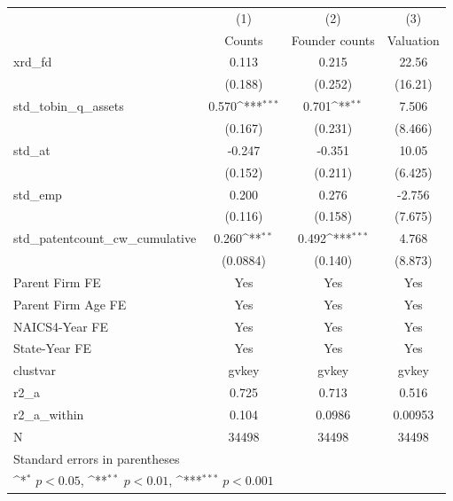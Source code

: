 {
\def\sym#1{\ifmmode^{#1}\else\(^{#1}\)\fi}
\begin{tabular}{l*{3}{c}}
\hline\hline
            &\multicolumn{1}{c}{(1)}&\multicolumn{1}{c}{(2)}&\multicolumn{1}{c}{(3)}\\
            &\multicolumn{1}{c}{Counts}&\multicolumn{1}{c}{Founder counts}&\multicolumn{1}{c}{Valuation}\\
\hline
xrd\_fd      &       0.113         &       0.215         &       22.56         \\
            &     (0.188)         &     (0.252)         &     (16.21)         \\
[1em]
std\_tobin\_q\_assets&       0.570\sym{***}&       0.701\sym{**} &       7.506         \\
            &     (0.167)         &     (0.231)         &     (8.466)         \\
[1em]
std\_at      &      -0.247         &      -0.351         &       10.05         \\
            &     (0.152)         &     (0.211)         &     (6.425)         \\
[1em]
std\_emp     &       0.200         &       0.276         &      -2.756         \\
            &     (0.116)         &     (0.158)         &     (7.675)         \\
[1em]
std\_patentcount\_cw\_cumulative&       0.260\sym{**} &       0.492\sym{***}&       4.768         \\
            &    (0.0884)         &     (0.140)         &     (8.873)         \\
[1em]
Parent Firm FE&         Yes         &         Yes         &         Yes         \\
[1em]
Parent Firm Age FE&         Yes         &         Yes         &         Yes         \\
[1em]
NAICS4-Year FE&         Yes         &         Yes         &         Yes         \\
[1em]
State-Year FE&         Yes         &         Yes         &         Yes         \\
\hline
clustvar    &       gvkey         &       gvkey         &       gvkey         \\
r2\_a        &       0.725         &       0.713         &       0.516         \\
r2\_a\_within &       0.104         &      0.0986         &     0.00953         \\
N           &       34498         &       34498         &       34498         \\
\hline\hline
\multicolumn{4}{l}{\footnotesize Standard errors in parentheses}\\
\multicolumn{4}{l}{\footnotesize \sym{*} \(p<0.05\), \sym{**} \(p<0.01\), \sym{***} \(p<0.001\)}\\
\end{tabular}
}

